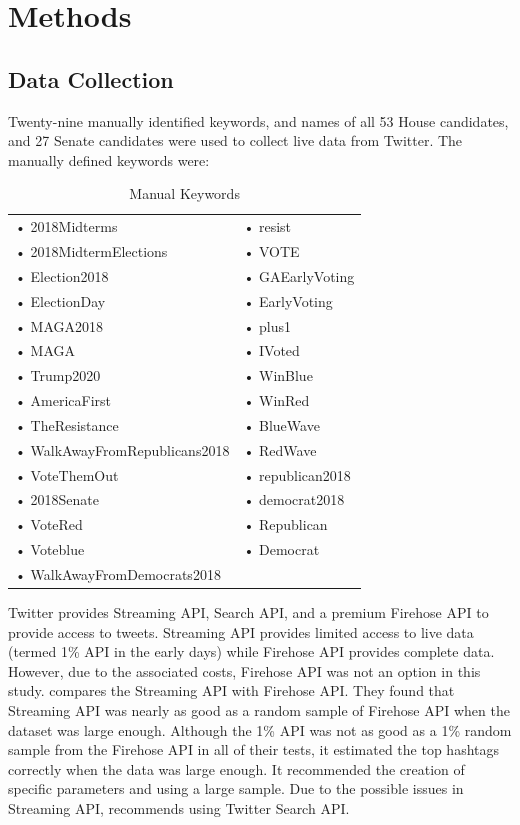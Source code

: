 \documentclass[letterpaper]{article}
\begin{document}
\section{Methods}
\label{sec:method}
\subsection{Data Collection}
Twenty-nine manually identified keywords, and names of all 53 House candidates, and 27 Senate candidates were used to collect live data from Twitter. The manually defined keywords were:

\begin{table}[]
    \centering
    \begin{tabular}{ll}
    • 2018Midterms & • resist \\
    • 2018MidtermElections & • VOTE \\
    • Election2018 & • GAEarlyVoting \\
    • ElectionDay & • EarlyVoting \\
    • MAGA2018 & • plus1 \\
    • MAGA & • IVoted \\
    • Trump2020 & • WinBlue \\
    • AmericaFirst & • WinRed \\
    • TheResistance & • BlueWave \\
    • WalkAwayFromRepublicans2018 & • RedWave \\
    • VoteThemOut & • republican2018 \\
    • 2018Senate & • democrat2018 \\
    • VoteRed & • Republican \\
    • Voteblue & • Democrat \\
    • WalkAwayFromDemocrats2018 & 
    \end{tabular}
    \caption{Manual Keywords}
    \label{tab:manual-keywords}
    \end{table}

Twitter provides Streaming API, Search API, and a premium Firehose API to provide access to tweets. Streaming API provides limited access to live data (termed 1\% API in the early days) while Firehose API
provides complete data. However, due to the associated costs, Firehose API was not an option in this study. \cite{morstatter2013sample} compares the Streaming API with Firehose API.
They found that Streaming API was nearly as good as a random sample of Firehose API when the dataset was large enough. Although the 1\% API was not as good as a 1\% random sample from the Firehose API in 
all of their tests, it estimated the top hashtags correctly when the data was large enough. It recommended the creation of specific parameters and using a large sample. 
Due to the possible issues in Streaming API, \cite{bessi2016social} recommends using Twitter Search API. 
\end{document}
